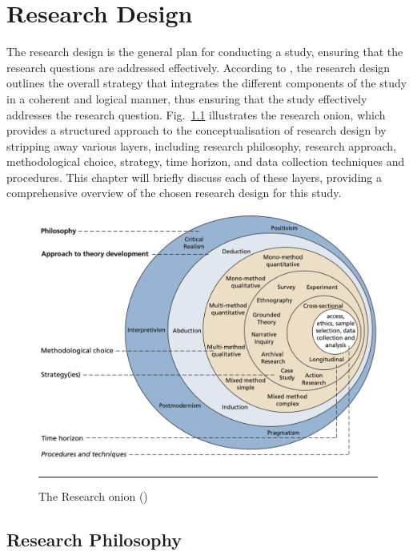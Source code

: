 \chapter{Research Design}\label{chap:research-design}

The research design is the general plan for conducting a study, ensuring that the research questions are addressed effectively.
According to \textcite{SaundersMark2023}, the research design outlines the overall strategy that integrates the different components of the study in a coherent and logical manner, thus ensuring that the study effectively addresses the research question.
Fig.~\ref{fig:research-onion} illustrates the research onion, which provides a structured approach to the conceptualisation of research design by stripping away various layers, including research philosophy, research approach, methodological choice, strategy, time horizon, and data collection techniques and procedures.
This chapter will briefly discuss each of these layers, providing a comprehensive overview of the chosen research design for this study.

\begin{figure}[htbp]
    \centering
 \includegraphics[width=.9\textwidth]{figures/research-design/research-onion.png}
     \rule{35em}{0.5pt}
    \caption{The Research onion (\textcite{SaundersMark2023})} 
 \label{fig:research-onion}
\end{figure}

\section{Research Philosophy}\label{sec:research-philosophy}

%
